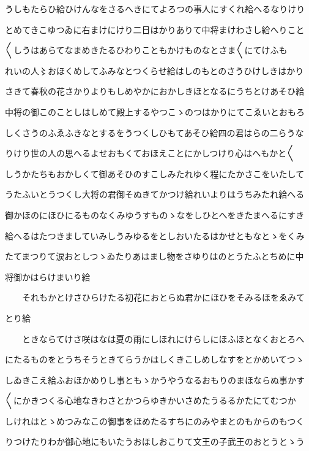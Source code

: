 \documentclass[a4paper,11pt,landscape]{ltjtarticle}
\begin{document}
\par\medskip
うしもたらひ給ひけんなをさるへきにてよろつの事人にすくれ給へるなりけり
\par\medskip
とめてきこゆつゐに右まけにけり二日はかりありて中将まけわさし給へりこと
\par\medskip
〱しうはあらてなまめきたるひわりこともかけものなとさま〱にてけふも
\par\medskip
れいの人〻おほくめしてふみなとつくらせ給はしのもとのさうひけしきはかり
\par\medskip
さきて春秋の花さかりよりもしめやかにおかしきほとなるにうちとけあそひ給
\par\medskip
中将の御このことしはしめて殿上するやつこゝのつはかりにてこゑいとおもろ
\par\medskip
しくさうのふゑふきなとするをうつくしひもてあそひ給四の君はらの二らうな
\par\medskip
りけり世の人の思へるよせおもくておほえことにかしつけり心はへもかと〱
\par\medskip
しうかたちもおかしくて御あそひのすこしみたれゆく程にたかさこをいたして
\par\medskip
うたふいとうつくし大将の君御そぬきてかつけ給れいよりはうちみたれ給へる
\par\medskip
御かほのにほひにるものなくみゆうすものゝなをしひとへをきたまへるにすき
\par\medskip
給へるはたつきましていみしうみゆるをとしおいたるはかせともなとゝをくみ
\par\medskip
たてまつりて涙おとしつゝゐたりあはまし物をさゆりはのとうたふとちめに中
\par\medskip
将御かはらけまいり給
\par\medskip
　　それもかとけさひらけたる初花におとらぬ君かにほひをそみるほをゑみて
\par\medskip
とり給
\par\medskip
　　ときならてけさ咲はなは夏の雨にしほれにけらしにほふほとなくおとろへ
\par\medskip
にたるものをとうちそうときてらうかはしくきこしめしなすをとかめいてつゝ
\par\medskip
しゐきこえ給ふおほかめりし事ともゝかうやうなるおもりのまほならぬ事かす
\par\medskip
〱にかきつくる心地なきわさとかつらゆきかいさめたうるるかたにてむつか
\par\medskip
しけれはとゝめつみなこの御事をほめたるすちにのみやまとのもからのもつく
\par\medskip
りつけたりわか御心地にもいたうおほしおこりて文王の子武王のおとうとゝう
\end{document}
